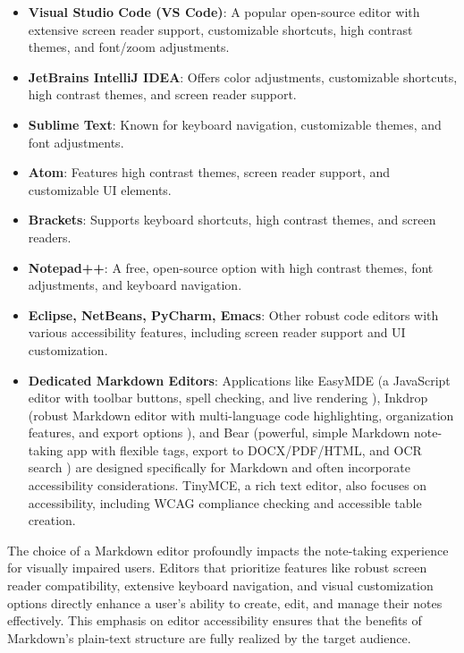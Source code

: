 \begin{itemize}
    \item \textbf{Visual Studio Code (VS Code)}: A popular open-source editor with extensive screen reader support, customizable shortcuts, high contrast themes, and font/zoom adjustments. \cite{DailyDevEditors}
    \item \textbf{JetBrains IntelliJ IDEA}: Offers color adjustments, customizable shortcuts, high contrast themes, and screen reader support. \cite{DailyDevEditors}
    \item \textbf{Sublime Text}: Known for keyboard navigation, customizable themes, and font adjustments. \cite{DailyDevEditors}
    \item \textbf{Atom}: Features high contrast themes, screen reader support, and customizable UI elements. \cite{DailyDevEditors}
    \item \textbf{Brackets}: Supports keyboard shortcuts, high contrast themes, and screen readers. \cite{DailyDevEditors}
    \item \textbf{Notepad++}: A free, open-source option with high contrast themes, font adjustments, and keyboard navigation. \cite{DailyDevEditors}
    \item \textbf{Eclipse, NetBeans, PyCharm, Emacs}: Other robust code editors with various accessibility features, including screen reader support and UI customization. \cite{DailyDevEditors}
    \item \textbf{Dedicated Markdown Editors}: Applications like EasyMDE (a JavaScript editor with toolbar buttons, spell checking, and live rendering \cite{EasyMDE}), Inkdrop (robust Markdown editor with multi-language code highlighting, organization features, and export options \cite{Inkdrop}), and Bear (powerful, simple Markdown note-taking app with flexible tags, export to DOCX/PDF/HTML, and OCR search \cite{Bear}) are designed specifically for Markdown and often incorporate accessibility considerations. TinyMCE, a rich text editor, also focuses on accessibility, including WCAG compliance checking and accessible table creation. \cite{TinyMCE}
\end{itemize}

The choice of a Markdown editor profoundly impacts the note-taking experience for visually impaired users. Editors that prioritize features like robust screen reader compatibility, extensive keyboard navigation, and visual customization options directly enhance a user's ability to create, edit, and manage their notes effectively. This emphasis on editor accessibility ensures that the benefits of Markdown's plain-text structure are fully realized by the target audience.

